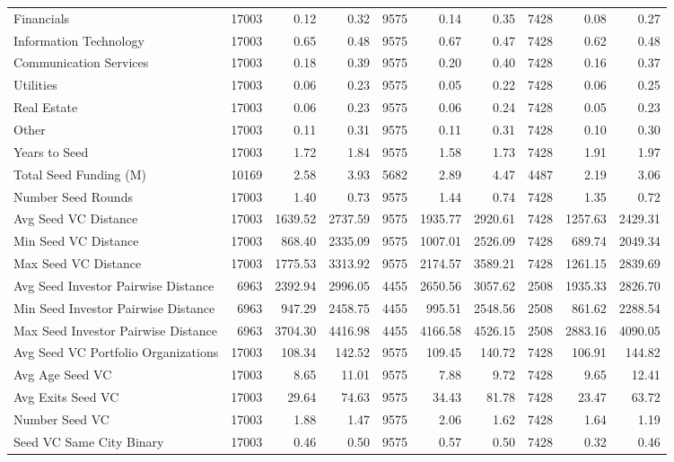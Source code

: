 {\begin{table}[!h]
{\begin{tabular}[t]{lrrrrrrrrr}
Financials & 17003 & 0.12 & 0.32 & 9575 & 0.14 & 0.35 & 7428 & 0.08 & 0.27\\
Information Technology & 17003 & 0.65 & 0.48 & 9575 & 0.67 & 0.47 & 7428 & 0.62 & 0.48\\
Communication Services & 17003 & 0.18 & 0.39 & 9575 & 0.20 & 0.40 & 7428 & 0.16 & 0.37\\
Utilities & 17003 & 0.06 & 0.23 & 9575 & 0.05 & 0.22 & 7428 & 0.06 & 0.25\\
\addlinespace
Real Estate & 17003 & 0.06 & 0.23 & 9575 & 0.06 & 0.24 & 7428 & 0.05 & 0.23\\
Other & 17003 & 0.11 & 0.31 & 9575 & 0.11 & 0.31 & 7428 & 0.10 & 0.30\\
Years to Seed & 17003 & 1.72 & 1.84 & 9575 & 1.58 & 1.73 & 7428 & 1.91 & 1.97\\
Total Seed Funding (M) & 10169 & 2.58 & 3.93 & 5682 & 2.89 & 4.47 & 4487 & 2.19 & 3.06\\
Number Seed Rounds & 17003 & 1.40 & 0.73 & 9575 & 1.44 & 0.74 & 7428 & 1.35 & 0.72\\
\addlinespace
Avg Seed VC Distance & 17003 & 1639.52 & 2737.59 & 9575 & 1935.77 & 2920.61 & 7428 & 1257.63 & 2429.31\\
Min Seed VC Distance & 17003 & 868.40 & 2335.09 & 9575 & 1007.01 & 2526.09 & 7428 & 689.74 & 2049.34\\
Max Seed VC Distance & 17003 & 1775.53 & 3313.92 & 9575 & 2174.57 & 3589.21 & 7428 & 1261.15 & 2839.69\\
Avg Seed Investor Pairwise Distance & 6963 & 2392.94 & 2996.05 & 4455 & 2650.56 & 3057.62 & 2508 & 1935.33 & 2826.70\\
Min Seed Investor Pairwise Distance & 6963 & 947.29 & 2458.75 & 4455 & 995.51 & 2548.56 & 2508 & 861.62 & 2288.54\\
\addlinespace
Max Seed Investor Pairwise Distance & 6963 & 3704.30 & 4416.98 & 4455 & 4166.58 & 4526.15 & 2508 & 2883.16 & 4090.05\\
Avg Seed VC Portfolio Organizations & 17003 & 108.34 & 142.52 & 9575 & 109.45 & 140.72 & 7428 & 106.91 & 144.82\\
Avg Age Seed VC & 17003 & 8.65 & 11.01 & 9575 & 7.88 & 9.72 & 7428 & 9.65 & 12.41\\
Avg Exits Seed VC & 17003 & 29.64 & 74.63 & 9575 & 34.43 & 81.78 & 7428 & 23.47 & 63.72\\
Number Seed VC & 17003 & 1.88 & 1.47 & 9575 & 2.06 & 1.62 & 7428 & 1.64 & 1.19\\
\addlinespace
Seed VC Same City Binary & 17003 & 0.46 & 0.50 & 9575 & 0.57 & 0.50 & 7428 & 0.32 & 0.46\\

\end{tabular}}
\end{table}}
